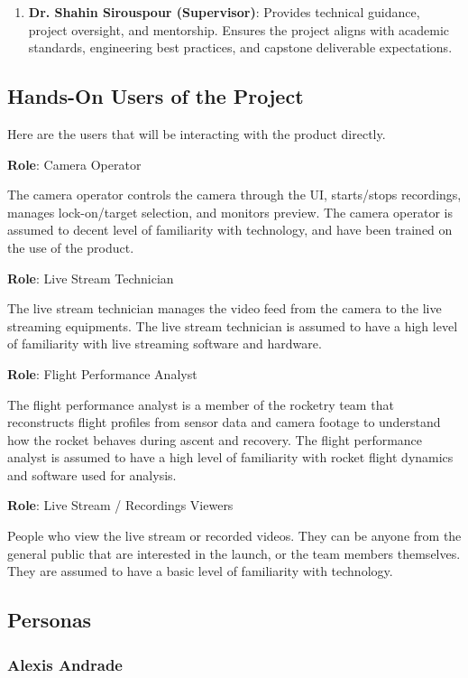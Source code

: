 \documentclass[12pt]{article}
\begin{document}
\begin{enumerate}
  \item \textbf{Dr. Shahin Sirouspour (Supervisor)}: Provides
        technical guidance, project oversight, and mentorship. Ensures
        the project aligns with academic standards, engineering best
        practices, and capstone deliverable expectations.
\end{enumerate}

\subsection{Hands-On Users of the Project}

Here are the users that will be interacting with the product directly.

\textbf{Role}: Camera Operator

The camera operator controls the camera through the UI, starts/stops
recordings, manages lock-on/target selection, and monitors preview. The camera
operator is assumed to decent level of familiarity with technology, and have
been trained on the use of the product.

\textbf{Role}: Live Stream Technician

The live stream technician manages the video feed from the camera to the live
streaming equipments. The live stream technician is assumed to have a high
level of familiarity with live streaming software and hardware.

\textbf{Role}: Flight Performance Analyst

The flight performance analyst is a member of the rocketry team that
reconstructs flight profiles from sensor data and camera footage to understand
how the rocket behaves during ascent and recovery. The flight performance
analyst is assumed to have a high level of familiarity with rocket flight
dynamics and software used for analysis.

\textbf{Role}: Live Stream / Recordings Viewers

People who view the live stream or recorded videos. They can be anyone from the
general public that are interested in the launch, or the team members
themselves. They are assumed to have a basic level of familiarity with
technology.

\subsection{Personas}

\subsubsection*{Alexis Andrade}
\end{document}
